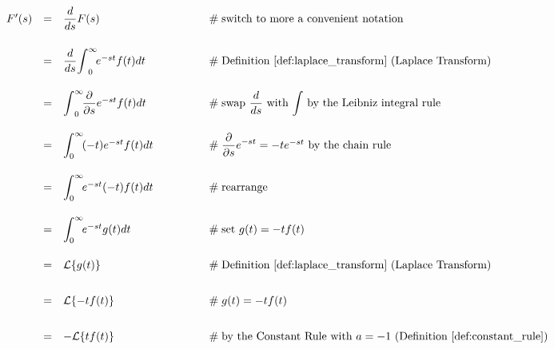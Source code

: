 \documentclass{article}
\theoremstyle{definition}
\begin{document}
\bigskip
\begin{equation*}
\begin{array}{lllll}
F^\prime(s)
&=& \dfrac{d}{ds} F(s)                                                                                        &\qquad \qquad \mathrel{\#} \text{switch to more a convenient notation}                                                                    \\
[20pt]
&=& \dfrac{d}{ds} \mathlarger{\int} ^\infty_0 \! e^{-st}  f(t) dt                              &\qquad \qquad \mathrel{\#} \text{Definition \ref{def:laplace_transform} (Laplace Transform)}                                   \\  
[20pt]
&=& \mathlarger{\int} ^\infty_0 \! \dfrac{\partial}{\partial s} e^{-st}  f(t) dt           &\qquad \qquad \mathrel{\#} \text{swap $\dfrac{d}{ds}$ with $\mathlarger{\int}$ by the Leibniz integral rule}             \\                                                                                    
[20pt]
&=&  \mathlarger{\int}^\infty_0 \! (-t) e^{-st} f(t) dt                                             &\qquad \qquad \mathrel{\#} \mathlarger{\dfrac{\partial}{\partial s} e^{-st}} = -t e^{-st} \text{ by the chain rule}            \\
[20pt]
&=&  \mathlarger{\int}^\infty_0 \! e^{-st}  (-t) f(t) dt                                            &\qquad \qquad \mathrel{\#} \text{rearrange}                                                                                                                \\
[20pt]
&=&  \mathlarger{\int}^\infty_0 \! e^{-st} g(t) dt                                                  &\qquad \qquad \mathrel{\#} \text{set $g(t) = -t f(t)$}                                                                                                    \\
[20pt]
&=& \mathcal{L}\{g(t)\}                                                                                       &\qquad \qquad \mathrel{\#} \text{Definition \ref{def:laplace_transform} (Laplace Transform)}                                   \\
[20pt]
&=& \mathcal{L}\{-tf(t)\}                                                                                     &\qquad \qquad \mathrel{\#} g(t) = -t f(t)                                                                                                                       \\
[20pt]
&=& -\mathcal{L}\{tf(t)\}                                                                                    &\qquad \qquad \mathrel{\#} \text{by the Constant Rule with $a = -1$ (Definition \ref{def:constant_rule})}
\end{array}
\end{equation*}
\end{document}
